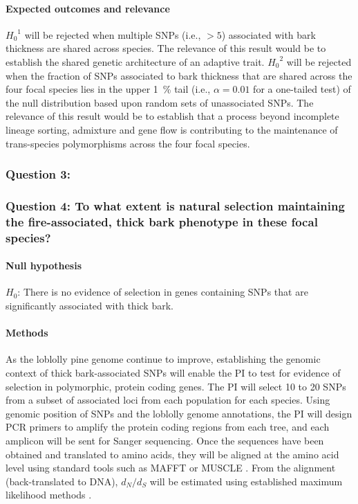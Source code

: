 \paragraph{Expected outcomes and relevance} ${H_{0}}^1$ will be rejected when multiple SNPs (i.e., $> 5$) associated 
with bark thickness are shared across species. The relevance of this result would be to establish the shared genetic 
architecture of an adaptive trait. ${H_{0}}^2$ will be rejected when the fraction of SNPs associated to bark thickness that are 
shared across the four focal species lies in the upper \SI{1}{\percent} tail (i.e., $\alpha = 0.01$ for a one-tailed test) 
of the null distribution based upon random sets of unassociated SNPs. The relevance of this result would be to 
establish that a process beyond incomplete lineage sorting, admixture and gene flow is contributing to the 
maintenance of trans-species 
polymorphisms across the four focal species. 


\subsubsection*{Question 3:}

\subsubsection*{Question 4: To what extent is natural selection maintaining the fire-associated, thick bark phenotype in these focal species?}

\paragraph{Null hypothesis} $H_0$: There is no evidence of selection in genes containing SNPs that are significantly associated 
with thick bark.

\paragraph{Methods} As the loblolly pine genome continue to improve, establishing the genomic context of thick 
bark-associated SNPs will enable the PI to test for evidence of selection in polymorphic, protein coding genes.  The PI will select 
10 to 20 SNPs from a subset of associated loci from each population for each species.   Using genomic position of SNPs and the loblolly 
genome annotations, the PI will design PCR primers to amplify the protein coding regions from each tree, and each amplicon will be sent 
for Sanger sequencing.  Once the sequences have been obtained and translated to amino acids, they will be aligned at the amino acid level 
using standard tools such as MAFFT \citep{Katoh:2005ia} or MUSCLE \citep{Edgar:2004ic}.  From the alignment (back-translated to DNA), 
$d_N/d_S$ will be estimated using established maximum likelihood methods \citep{Yang:2007ki}.

